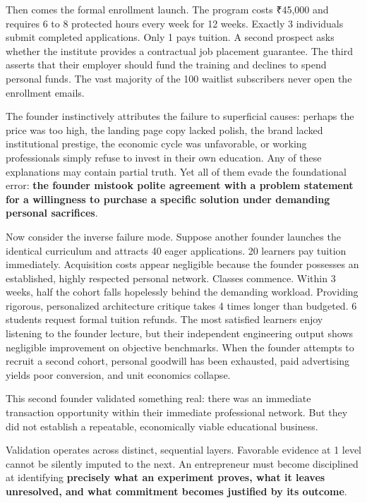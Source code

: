 Then comes the formal enrollment launch. The program costs ₹45,000 and requires 6 to 8 protected hours every week for 12 weeks. Exactly 3 individuals submit completed applications. Only 1 pays tuition. A second prospect asks whether the institute provides a contractual job placement guarantee. The third asserts that their employer should fund the training and declines to spend personal funds. The vast majority of the 100 waitlist subscribers never open the enrollment emails.

The founder instinctively attributes the failure to superficial causes: perhaps the price was too high, the landing page copy lacked polish, the brand lacked institutional prestige, the economic cycle was unfavorable, or working professionals simply refuse to invest in their own education. Any of these explanations may contain partial truth. Yet all of them evade the foundational error: \textbf{the founder mistook polite agreement with a problem statement for a willingness to purchase a specific solution under demanding personal sacrifices}.

Now consider the inverse failure mode. Suppose another founder launches the identical curriculum and attracts 40 eager applications. 20 learners pay tuition immediately. Acquisition costs appear negligible because the founder possesses an established, highly respected personal network. Classes commence. Within 3 weeks, half the cohort falls hopelessly behind the demanding workload. Providing rigorous, personalized architecture critique takes 4 times longer than budgeted. 6 students request formal tuition refunds. The most satisfied learners enjoy listening to the founder lecture, but their independent engineering output shows negligible improvement on objective benchmarks. When the founder attempts to recruit a second cohort, personal goodwill has been exhausted, paid advertising yields poor conversion, and unit economics collapse.

This second founder validated something real: there was an immediate transaction opportunity within their immediate professional network. But they did not establish a repeatable, economically viable educational business.

Validation operates across distinct, sequential layers. Favorable evidence at 1 level cannot be silently imputed to the next. An entrepreneur must become disciplined at identifying \textbf{precisely what an experiment proves, what it leaves unresolved, and what commitment becomes justified by its outcome}.


